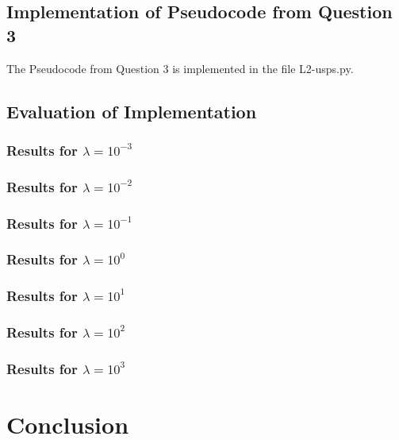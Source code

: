 \documentclass[letterpaper,10pt]{article}
\begin{document}
\subsection{Implementation of Pseudocode from Question 3}
The Pseudocode from Question 3 is implemented in the file L2-usps.py.

\subsection{Evaluation of Implementation}
\subsubsection{Results for \(\lambda = 10^{-3}\)}
\subsubsection{Results for \(\lambda = 10^{-2}\)}
\subsubsection{Results for \(\lambda = 10^{-1}\)}
\subsubsection{Results for \(\lambda = 10^{0}\)}
\subsubsection{Results for \(\lambda = 10^{1}\)}
\subsubsection{Results for \(\lambda = 10^{2}\)}
\subsubsection{Results for \(\lambda = 10^{3}\)}

\section{Conclusion}
\end{document}
